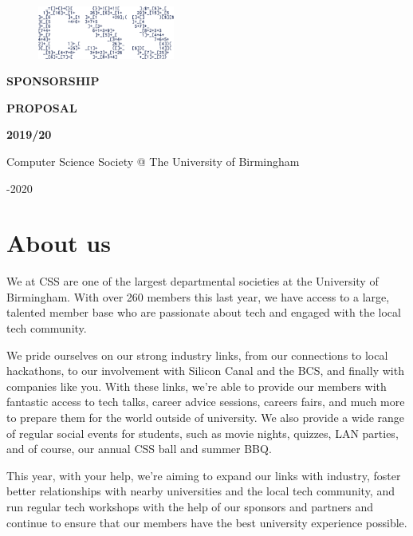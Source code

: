\documentclass{article}
\begin{document}
\begin{figure}
  \includegraphics[width=0.4\textwidth]{CSS_Logo}
\end{figure}

\vspace*{0.1cm}

\fontsize{56}{50}\selectfont

\noindent\textbf{SPONSORSHIP}

\par

\noindent\textbf{PROPOSAL}

\par

\noindent\textbf{2019/20}

\fontsize{13}{18}\selectfont

\vspace{0.5cm}

\noindent Computer Science Society @ The University of Birmingham 

-2020

\vspace{1cm}

\section*{About us}

We at CSS are one of the largest departmental societies at the University of Birmingham. With over 260 members this last year, we have access to a large, talented member base who are passionate about tech and engaged with the local tech community.

We pride ourselves on our strong industry links, from our connections to local hackathons, to our involvement with Silicon Canal and the BCS, and finally with companies like you.
With these links, we're able to provide our members with fantastic access to tech talks, career advice sessions, careers fairs, and much more to prepare them for the world outside of university.
We also provide a wide range of regular social events for students, such as movie nights, quizzes, LAN parties, and of course, our annual CSS ball and summer BBQ.

This year, with your help, we're aiming to expand our links with industry, foster better relationships with nearby universities and the local tech community, and run regular tech workshops with the help of our sponsors and partners and continue to ensure that our members have the best university experience possible.
\end{document}
